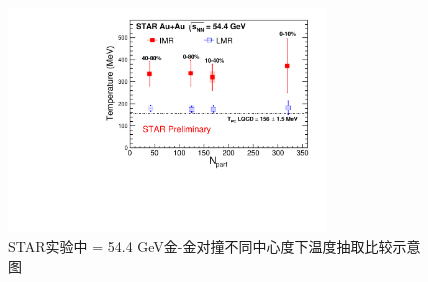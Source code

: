\begin{figure}[htb]
    \begin{center}
    \includegraphics[width=0.75\textwidth,clip]{figures/Chapter4/T_vs_Npart_Run17_54GeV.pdf}
    \end{center}
    \caption[STAR实验中 \sNN = 54.4 GeV金-金对撞不同中心度下温度抽取比较示意图]{STAR实验中 \sNN = 54.4 GeV金-金对撞不同中心度下温度抽取比较示意图}
    \label{fig:T_vs_Npart_Run17_54GeV}
\end{figure}